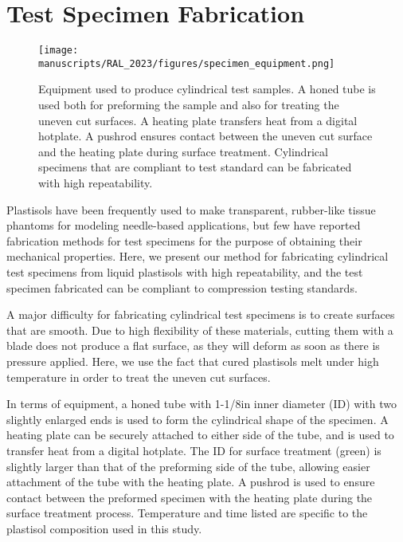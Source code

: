 \appendix 
\makeatletter
{}
\makeatother
\renewcommand{\thechapter}{\Alph{chapter}}

\chapter{Test Specimen Fabrication} \label{chap:appendix-a}
\begin{figure}[b]
  \centering
  \texttt{[image: manuscripts/RAL\_2023/figures/specimen\_equipment.png]}
  \caption{Equipment used to produce cylindrical test samples. A honed tube is used both for preforming the sample and also for treating the uneven cut surfaces. A heating plate transfers heat from a digital hotplate. A pushrod ensures contact between the uneven cut surface and the heating plate during surface treatment. Cylindrical specimens that are compliant to test standard can be fabricated with high repeatability.}
  \label{fig:specimen_equipment}
\end{figure}

Plastisols have been frequently used to make transparent, rubber-like tissue phantoms for modeling needle-based applications, but few have reported fabrication methods for test specimens for the purpose of obtaining their mechanical properties. Here, we present our method for fabricating cylindrical test specimens from liquid plastisols with high repeatability, and the test specimen fabricated can be compliant to compression testing standards.

A major difficulty for fabricating cylindrical test specimens is to create surfaces that are smooth. Due to high flexibility of these materials, cutting them with a blade does not produce a flat surface, as they will deform as soon as there is pressure applied. Here, we use the fact that cured plastisols melt under high temperature in order to treat the uneven cut surfaces.

In terms of equipment, a honed tube with 1-1/8in inner diameter (ID) with two slightly enlarged ends is used to form the cylindrical shape of the specimen. A heating plate can be securely attached to either side of the tube, and is used to transfer heat from a digital hotplate. The ID for surface treatment (green) is slightly larger than that of the preforming side of the tube, allowing easier attachment of the tube with the heating plate. A pushrod is used to ensure contact between the preformed specimen with the heating plate during the surface treatment process. Temperature and time listed are specific to the plastisol composition used in this study.


